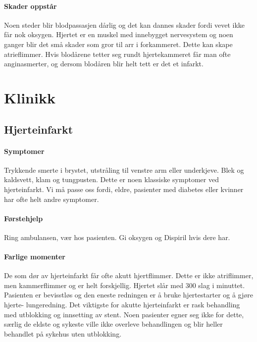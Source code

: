 			\paragraph{Skader oppstår\\}
				Noen steder blir blodpassasjen dårlig og det kan dannes skader fordi vevet ikke får nok oksygen. Hjertet er en muskel med innebygget nervesystem og noen ganger blir det små skader som gror til arr i forkammeret. Dette kan skape atrieflimmer\cite{!!!}. Hvis blodårene tetter seg rundt hjertekammeret får man ofte anginasmerter, og dersom blodåren blir helt tett er det et infarkt.
		\section{Klinikk}
			\subsection{Hjerteinfarkt}	
				\paragraph{Symptomer\\}
					Trykkende smerte i brystet, utstråling til venstre arm eller underkjeve. Blek og kaldsvett, klam og tungpusten. Dette er noen klassiske symptomer ved hjerteinfarkt. Vi må passe oss fordi, eldre, pasienter med diabetes eller kvinner har ofte helt andre symptomer. 
				\paragraph{Førstehjelp\\}
					Ring ambulansen, vær hos pasienten. Gi oksygen og Dispiril hvis dere har. 
				\paragraph{Farlige momenter\\}
					De som dør av hjerteinfarkt får ofte akutt hjertflimmer. Dette er ikke atriflimmer, men kammerflimmer og er helt forskjellig. Hjertet slår med 300 slag i minuttet. Pasienten er bevisstløs og den eneste redningen er å bruke hjertestarter og å gjøre hjerte- lungeredning. Det viktigste for akutte hjerteinfarkt er rask behandling med utblokking og innsetting av stent. Noen pasienter egner seg ikke for dette, særlig de eldste og sykeste ville ikke overleve behandlingen og blir heller behandlet på sykehus uten utblokking. 

